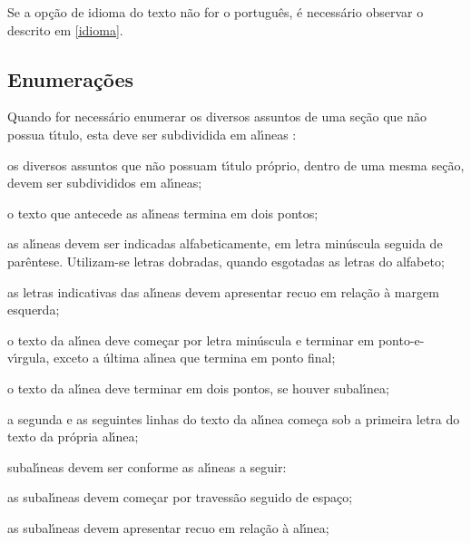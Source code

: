 Se a op\c{c}\~ao de idioma do texto n\~ao for o portugu\^es, \'e necess\'ario observar o descrito em \ref{idioma}.

\subsection{Enumera\c{c}\~oes}

Quando for necess\'ario enumerar
os diversos assuntos de uma se\c{c}\~ao que n\~ao possua t\'{\i}tulo, esta deve ser
subdividida em al\'{\i}neas \cite[4.2]{nbr6024}:

\begin{alineas}

  \item os diversos assuntos que n\~ao possuam t\'{\i}tulo pr\'oprio, dentro de uma mesma
  se\c{c}\~ao, devem ser subdivididos em al\'{\i}neas; 
  
  \item o texto que antecede as al\'{\i}neas termina em dois pontos;
  \item as al\'{\i}neas devem ser indicadas alfabeticamente, em letra min\'uscula
  seguida de par\^entese. Utilizam-se letras dobradas, quando esgotadas as
  letras do alfabeto;

  \item as letras indicativas das al\'{\i}neas devem apresentar recuo em rela\c{c}\~ao \`a
  margem esquerda;

  \item o texto da al\'{\i}nea deve come\c{c}ar por letra min\'uscula e terminar em
  ponto-e-v\'{\i}rgula, exceto a \'ultima al\'{\i}nea que termina em ponto final;

  \item o texto da al\'{\i}nea deve terminar em dois pontos, se houver subal\'{\i}nea;

  \item a segunda e as seguintes linhas do texto da al\'{\i}nea come\c{c}a sob a
  primeira letra do texto da pr\'opria al\'{\i}nea;
  
  \item subal\'{\i}neas \cite{nbr6024} devem ser conforme as al\'{\i}neas a
  seguir:

  \begin{alineas}
     \item as subal\'{\i}neas devem come\c{c}ar por travess\~ao seguido de espa\c{c}o;

     \item as subal\'{\i}neas devem apresentar recuo em rela\c{c}\~ao \`a al\'{\i}nea;


\end{alineas}
\end{alineas}
